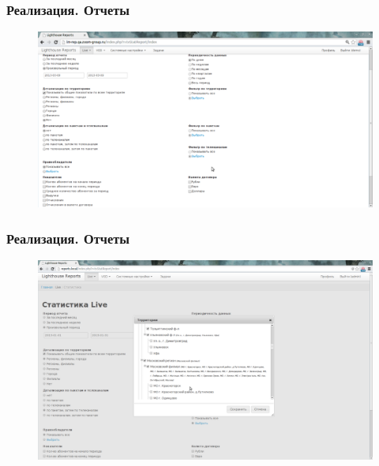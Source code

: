 \documentclass{beamer}
\begin{document}
\begin{frame}
\frametitle{Реализация. Отчеты}
\begin{figure}
\vspace{-1cm}
\hspace*{-1cm} \includegraphics[scale=0.3]{../resources/lm_screen.pdf}
\end{figure}
\end{frame}

\begin{frame}
\frametitle{Реализация. Отчеты}
\begin{figure}
\vspace{-0.5cm}
\hspace*{-1cm} \includegraphics[scale=0.26]{../resources/reports-region.pdf}
\end{figure}
\end{frame}
\end{document}
